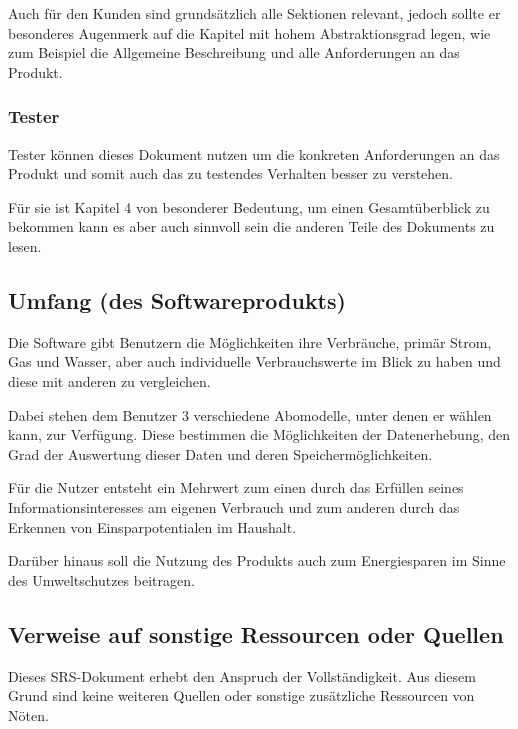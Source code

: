 Auch für den Kunden sind grundsätzlich alle Sektionen relevant, jedoch sollte er besonderes Augenmerk auf die Kapitel mit hohem Abstraktionsgrad legen, wie zum Beispiel die Allgemeine Beschreibung und alle Anforderungen an das Produkt.

\subsubsection{Tester}

Tester können dieses Dokument nutzen um die konkreten Anforderungen an das Produkt und somit auch das zu testendes Verhalten besser zu verstehen. 

Für sie ist Kapitel 4 von besonderer Bedeutung, um einen Gesamtüberblick zu bekommen kann es aber auch sinnvoll sein die anderen Teile des Dokuments zu lesen.

\subsection{Umfang (des Softwareprodukts)}

Die Software gibt Benutzern die Möglichkeiten ihre Verbräuche, primär Strom, Gas und Wasser, aber auch individuelle Verbrauchswerte im Blick zu haben und diese mit anderen zu vergleichen.

Dabei stehen dem Benutzer 3 verschiedene Abomodelle, unter denen er wählen kann, zur Verfügung. Diese bestimmen die Möglichkeiten der Datenerhebung, den Grad der Auswertung dieser Daten und deren Speichermöglichkeiten.

Für die Nutzer entsteht ein Mehrwert zum einen durch das Erfüllen seines Informationsinteresses am eigenen Verbrauch und zum anderen durch das Erkennen von Einsparpotentialen im Haushalt.

Darüber hinaus soll die Nutzung des Produkts auch zum Energiesparen im Sinne des Umweltschutzes beitragen.

\subsection{Verweise auf sonstige Ressourcen oder Quellen}

Dieses SRS-Dokument erhebt den Anspruch der Vollständigkeit. Aus diesem Grund sind keine weiteren Quellen oder sonstige zusätzliche Ressourcen von Nöten.
